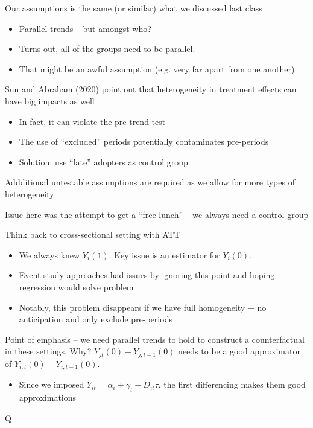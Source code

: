 \documentclass[notes,11pt, aspectratio=169]{beamer}
\newenvironment{wideitemize}{\itemize\addtolength{\itemsep}{10pt}}{\enditemize}
\begin{document}
\begin{frame}
  \begin{wideitemize}
  \item Our assumptions is the same (or similar) what we discussed last class
    \begin{itemize}
    \item Parallel trends -- but amongst who?
    \item Turns out, all of the groups need to be parallel.
    \item That might be an awful assumption (e.g. very far apart from
      one another)
    \end{itemize}
  \item Sun and Abraham (2020) point out that heterogeneity in
    treatment effects can have big impacts as well
    \begin{itemize}
    \item In fact, it can violate the pre-trend test
    \item The use of ``excluded'' periods potentially contaminates pre-periods
    \item Solution: use ``late'' adopters as control group. 
    \end{itemize}
    \item   Addditional untestable assumptions are required as we allow for more types of heterogeneity
  \end{wideitemize}
\end{frame}

\begin{frame}
  \begin{wideitemize}
  \item   Issue here was the attempt to get a ``free lunch'' -- we always need a control group
  \item   Think back to cross-sectional setting with ATT
    \begin{itemize}
    \item We always knew $Y_{i}(1)$. Key issue is an estimator for $Y_{i}(0)$.
    \item Event study approaches had issues by ignoring this point and hoping regression would solve problem
    \item Notably, this problem disappears if we have full homogeneity + no anticipation and only exclude pre-periods
    \end{itemize}
  \item Point of emphasis -- we need parallel trends to hold to
    construct a counterfactual in these settings. Why?
    $Y_{jt}(0) - Y_{j,t-1}(0)$ needs to be a good approximator of
    $Y_{i,t}(0) - Y_{i,t-1}(0)$.
    \begin{itemize}
    \item Since we imposed
      $Y_{it} = \alpha_{i} + \gamma_{t} + D_{it}\tau$, the first
      differencing makes them good approximations
    \end{itemize}
  \end{wideitemize}
\end{frame}Q
\end{document}
